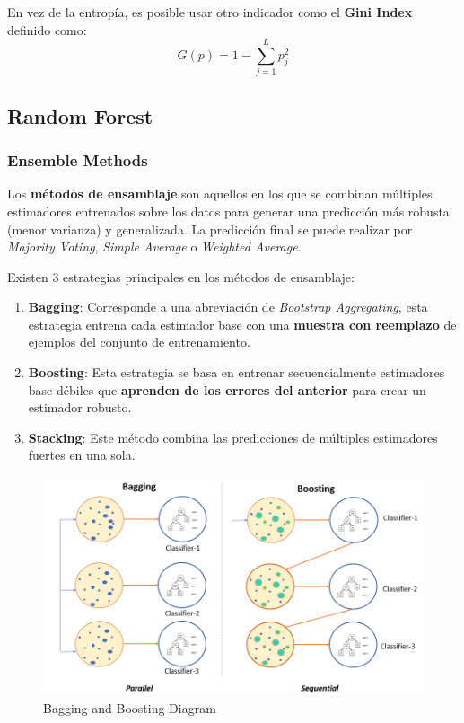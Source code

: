 En vez de la entropía, es posible usar otro indicador como el \textbf{Gini Index} definido como: 
$$G(p) = 1 - \sum_{j=1}^L p_j^2$$

\subsection{Random Forest}

\subsubsection{Ensemble Methods}

Los \textbf{métodos de ensamblaje} son aquellos en los que se combinan múltiples estimadores entrenados sobre los datos para generar una predicción más robusta (menor varianza) y generalizada. La predicción final se puede realizar por \textit{Majority Voting}, \textit{Simple Average} o \textit{Weighted Average}.

Existen 3 estrategias principales en los métodos de ensamblaje: 
\begin{enumerate}
    \item \textbf{Bagging}: Corresponde a una abreviación de \textit{Bootstrap Aggregating}, esta estrategia entrena cada estimador base con una \textbf{muestra con reemplazo} de ejemplos del conjunto de entrenamiento. 
    \item \textbf{Boosting}: Esta estrategia se basa en entrenar secuencialmente estimadores base débiles que \textbf{aprenden de los errores del anterior} para crear un estimador robusto.
    \item \textbf{Stacking}: Este método combina las predicciones de múltiples estimadores fuertes en una sola. 
\end{enumerate}

\begin{figure}[H]
    \center
    \includegraphics[scale=0.25]{notebooks/ML/img/bagging_and_boosting_diagram.png}
    \caption{Bagging and Boosting Diagram}
\end{figure}


